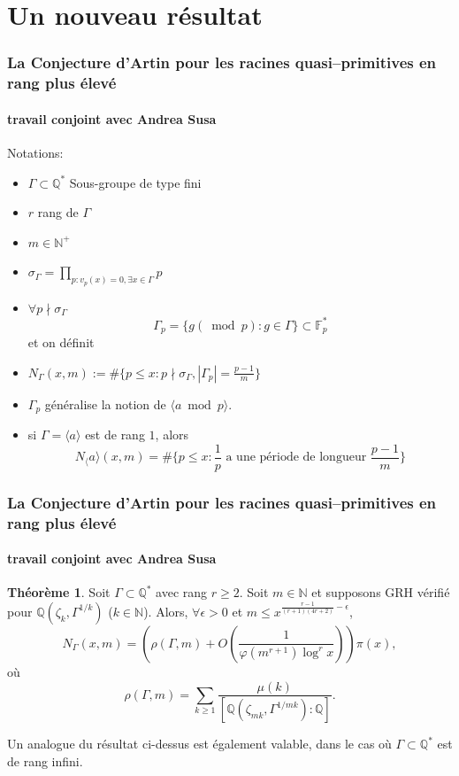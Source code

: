 \documentclass[10pt,handout]{beamer} %
\newcommand{\Q}{\mathbb Q}
\newcommand{\N}{\mathbb N}
\newcommand{\F}{\mathbb F}
\theoremstyle{definition}
\newtheorem{theoreme}[theorem]{{Th\'eor\`eme}}
\begin{document}
\section{Un nouveau r\'esultat}
 \begin{frame}
 \frametitle{La Conjecture d'Artin pour les racines quasi--primitives en  rang plus \'elev\'e}
\framesubtitle{travail conjoint avec Andrea Susa}

Notations:\pause

\begin{itemize}[<+-|alert@+>]
\item $\Gamma\subset\Q^*$ Sous-groupe de type fini
\item $r$ rang de $\Gamma$
\item $m \in \N^+$
\item $\sigma_\Gamma=\prod_{p: v_p(x)=0,\exists x \in \Gamma}p$
\item $\forall p\nmid\sigma_\Gamma$
$$\Gamma_p =\{g(\bmod{p}): g\in\Gamma\}\subset\F_p^*$$ 
et on d\'efinit
\item
$N_\Gamma(x,m) := \#\{p\leq x: p\nmid\sigma_\Gamma, |\Gamma_p| =\frac{p-1}m\}$
\item $\Gamma_p$ g\'en\'eralise la notion de $\langle a\bmod p\rangle$.
\item si $\Gamma=\langle a\rangle$ est de rang $1$, alors\\
$$N_\langle a\rangle(x,m) =\#\{p\leq x: \frac1p\text{ a une p\'eriode de longueur } \frac{p-1}m\}$$
\end{itemize}
\end{frame}

 \begin{frame}
 \frametitle{La Conjecture d'Artin pour les racines quasi--primitives en rang plus \'elev\'e}
\framesubtitle{travail conjoint avec Andrea Susa}

\begin{theoreme} Soit $\Gamma \subset \Q^*$ avec rang $r\ge2$. Soit $m\in\N$ 
 et supposons GRH   v\'erifi\'e pour $\Q(\zeta_{k},\Gamma^{1/k})$ ($k\in\N$). 
Alors, $\forall\epsilon>0$ et 
$m\le x^{\frac{r-1}{(r+1)(4r+2)}-\epsilon}$,\pause
$$N_{\Gamma}(x,m)=\left(\rho(\Gamma,m)+O\!\left(\frac{1}{\varphi(m^{r+1})\log^rx} %
\right)\right) \pi(x),$$
o\`u\pause
$$\rho(\Gamma,m)= \sum_{ k \geq 1}
\frac{\mu(k)}{[\Q(\zeta_{mk},\Gamma^{1/mk}):\Q]}.
$$
\end{theoreme}\pause

Un analogue du r\'esultat ci-dessus est \'egalement valable, dans le cas o\`u $\Gamma\subset\Q^*$ est de rang infini.
\end{frame}
 
\end{document}
